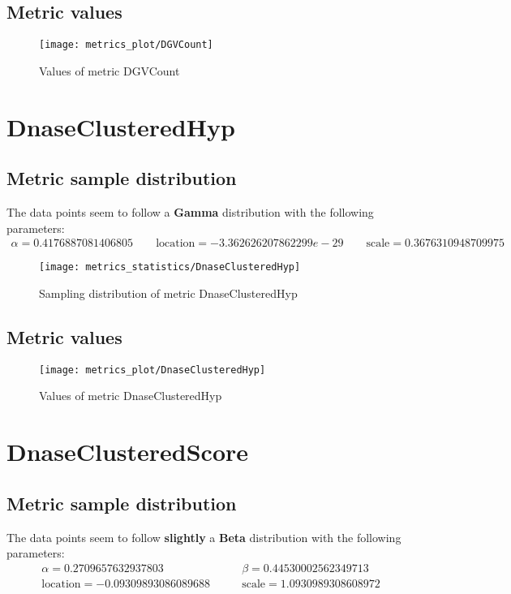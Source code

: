 \documentclass[\main/main.tex]{subfiles}
\begin{document}
\subsection{Metric values}
\begin{figure}
  \texttt{[image: metrics\_plot/DGVCount]}
  \caption{Values of metric DGVCount}
\end{figure}

\clearpage
\section{DnaseClusteredHyp}
\subsection{Metric sample distribution}
The data points seem to follow a \textbf{Gamma} distribution with the following parameters:
\begin{align*}
  \alpha   = 0.4176887081406805    \qquad  \text{location} = -3.362626207862299e-29 \qquad \text{scale} = 0.3676310948709975
\end{align*}
\begin{figure}
  \texttt{[image: metrics\_statistics/DnaseClusteredHyp]}
  \caption{Sampling distribution of metric DnaseClusteredHyp}
\end{figure}
\subsection{Metric values}
\begin{figure}
  \texttt{[image: metrics\_plot/DnaseClusteredHyp]}
  \caption{Values of metric DnaseClusteredHyp}
\end{figure}

\clearpage
\section{DnaseClusteredScore}
\subsection{Metric sample distribution}
The data points seem to follow \textbf{slightly} a \textbf{Beta} distribution with the following parameters:
\begin{align*}
  \alpha   = 0.2709657632937803          & \qquad  \beta = 0.44530002562349713      \\
  \text{location} = -0.09309893086089688 & \qquad \text{scale} = 1.0930989308608972
\end{align*}
\end{document}
